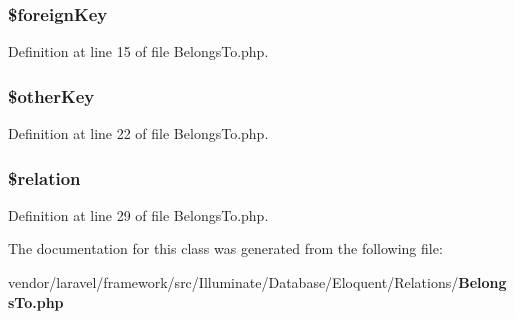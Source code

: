 \subsubsection[{\$foreign\+Key}]{\setlength{\rightskip}{0pt plus 5cm}\$foreign\+Key\hspace{0.3cm}{\ttfamily [protected]}}\label{class_illuminate_1_1_database_1_1_eloquent_1_1_relations_1_1_belongs_to_af59cb1cfc5aaef93836c92cfe59abc04}


Definition at line 15 of file Belongs\+To.\+php.

\subsubsection[{\$other\+Key}]{\setlength{\rightskip}{0pt plus 5cm}\$other\+Key\hspace{0.3cm}{\ttfamily [protected]}}\label{class_illuminate_1_1_database_1_1_eloquent_1_1_relations_1_1_belongs_to_aab553fc108eda149e05970ab095128d8}


Definition at line 22 of file Belongs\+To.\+php.

\subsubsection[{\$relation}]{\setlength{\rightskip}{0pt plus 5cm}\$relation\hspace{0.3cm}{\ttfamily [protected]}}\label{class_illuminate_1_1_database_1_1_eloquent_1_1_relations_1_1_belongs_to_a6b8f9d1b57d35bdd7a2caf31a72c69f0}


Definition at line 29 of file Belongs\+To.\+php.



The documentation for this class was generated from the following file\+:\begin{DoxyCompactItemize}
\item 
vendor/laravel/framework/src/\+Illuminate/\+Database/\+Eloquent/\+Relations/{\bf Belongs\+To.\+php}\end{DoxyCompactItemize}
